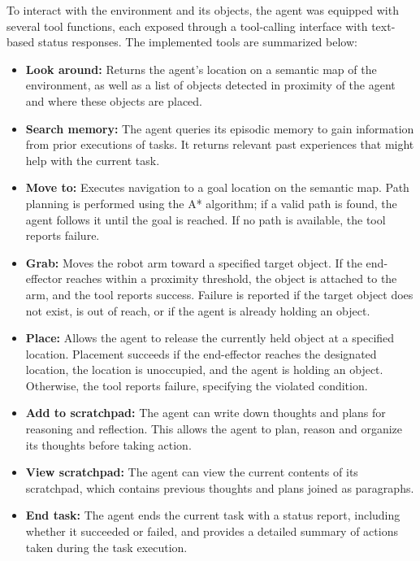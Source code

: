 \documentclass[../report.tex]{subfiles}
\begin{document}
To interact with the environment and its objects, the agent was equipped with several tool functions, each exposed through a tool-calling interface with text-based status responses. The implemented tools are summarized below:
\begin{itemize}
	\item \textbf{Look around:} Returns the agent's location on a semantic map of the environment, as well as a list of objects detected in proximity of the agent and where these objects are placed.
	\item \textbf{Search memory:} The agent queries its episodic memory to gain information from prior executions of tasks. It returns relevant past experiences that might help with the current task.
	\item \textbf{Move to:} Executes navigation to a goal location on the semantic map. Path planning is performed using the A* algorithm; if a valid path is found, the agent follows it until the goal is reached. If no path is available, the tool reports failure.
	\item \textbf{Grab:} Moves the robot arm toward a specified target object. If the end-effector reaches within a proximity threshold, the object is attached to the arm, and the tool reports success. Failure is reported if the target object does not exist, is out of reach, or if the agent is already holding an object.
	\item \textbf{Place:} Allows the agent to release the currently held object at a specified location. Placement succeeds if the end-effector reaches the designated location, the location is unoccupied, and the agent is holding an object. Otherwise, the tool reports failure, specifying the violated condition.
	\item \textbf{Add to scratchpad:} The agent can write down thoughts and plans for reasoning and reflection. This allows the agent to plan, reason and organize its thoughts before taking action.
	\item \textbf{View scratchpad:} The agent can view the current contents of its scratchpad, which contains previous thoughts and plans joined as paragraphs.
	\item \textbf{End task:} The agent ends the current task with a status report, including whether it succeeded or failed, and provides a detailed summary of actions taken during the task execution.
\end{itemize}
\end{document}
